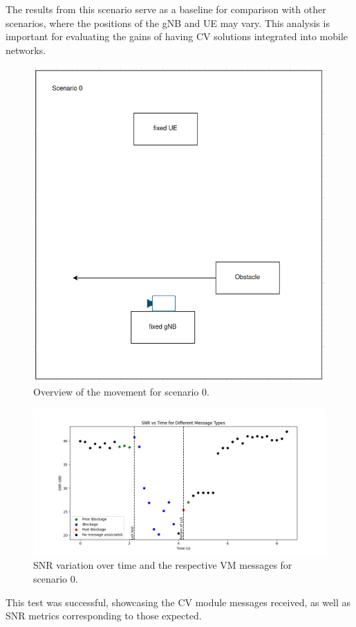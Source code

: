 The results from this scenario serve as a baseline for comparison with other scenarios, where the positions of the gNB and UE may vary.
This analysis is important for evaluating the gains of having CV solutions integrated into mobile networks.

\begin{figure}[H]
    \centering
    \includegraphics[width=0.5\linewidth]{figures/scenario0}
    \caption{Overview of the movement for scenario 0.}
    \label{fig:test_fixed}
\end{figure}

\begin{figure}[H]
    \centering
    \includegraphics[width=\linewidth]{figures/results_0}
    \caption{SNR variation over time and the respective VM messages for scenario 0.}
    \label{fig:results_0}
\end{figure}


This test was successful, showcasing the CV module messages received, as well as SNR metrics corresponding to those expected.


